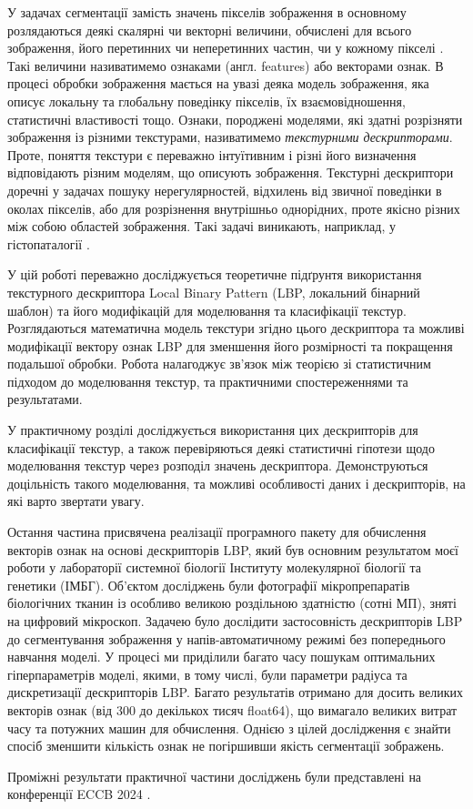 У задачах сегментації замість значень пікселів зображення в основному розлядаються деякі скалярні чи векторні величини,
обчислені для всього зображення, його перетинних чи неперетинних частин, чи у кожному пікселі \cite{belsare2015, simon2018, esteva2017}. 
Такі величини називатимемо ознаками (англ. features) або векторами ознак.
В процесі обробки зображення мається на увазі деяка модель зображення, яка описує локальну та глобальну поведінку пікселів, їх взаємовідношення, статистичні властивості тощо.
Ознаки, породжені моделями, які здатні розрізняти зображення із різними текстурами, називатимемо \emph{текстурними дескрипторами}.
Проте, поняття текстури є переважно інтуїтивним і різні його визначення відповідають різним моделям, що описують зображення.  
Текстурні дескриптори доречні у задачах пошуку нерегулярностей, відхилень від звичної поведінки в околах пікселів, 
або для розрізнення внутрішньо однорідних, проте якісно різних між собою областей зображення. 
Такі задачі виникають, наприклад, у гістопаталогії \cite{simon2018}.

У цій роботі переважно досліджується теоретичне підґрунтя використання текстурного дескриптора Local Binary Pattern 
(LBP, локальний бінарний шаблон) \cite{ojala2002} та його модифікацій для моделювання та класифікації текстур.
Розглядаються математична модель текстури згідно цього дескриптора та можливі модифікації вектору ознак LBP для зменшення його розмірності та покращення подальшої обробки.
Робота налагоджує зв'язок між теорією зі статистичним підходом до моделювання текстур, та практичними спостереженнями та результатами.

У практичному розділі досліджується використання цих дескрипторів для класифікації текстур, 
а також перевіряються деякі статистичні гіпотези щодо моделювання текстур через розподіл значень дескриптора.
Демонструються доцільність такого моделювання, та можливі особливості даних і дескрипторів, на які варто звертати увагу.

Остання частина присвячена реалізації програмного пакету для обчислення векторів ознак на основі дескрипторів LBP, який був
основним результатом моєї роботи у лабораторії системної біології Інституту молекулярної біології та генетики (ІМБГ).
Об'єктом досліджень були фотографії мікропрепаратів біологічних тканин із особливо великою роздільною здатністю (сотні МП), зняті на цифровий мікроскоп.
Задачею було дослідити застосовність дескрипторів LBP до сегментування зображення у напів-автоматичному режимі без попереднього навчання моделі.
У процесі ми приділили багато часу пошукам оптимальних гіперпараметрів моделі, якими, в тому числі, були параметри радіуса та дискретизації дескрипторів LBP.
Багато результатів отримано для досить великих векторів ознак (від 300 до декількох тисяч float64), що вимагало великих витрат часу та потужних машин для обчислення.
Однією з цілей дослідження є знайти спосіб зменшити кількість ознак не погіршивши якість сегментації зображень.

Проміжні результати практичної частини досліджень були представлені на конференції ECCB 2024 \cite{fastlbp2024}.
